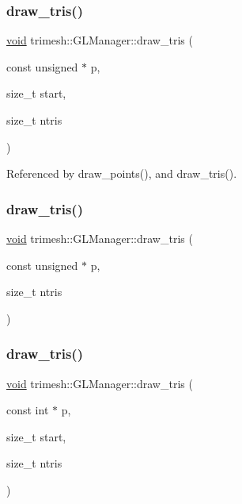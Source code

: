 \subsubsection{\texorpdfstring{draw\+\_\+tris()}{draw\_tris()}\hspace{0.1cm}{\footnotesize\ttfamily [1/9]}}
{\footnotesize\ttfamily \hyperlink{namespacetrimesh_a784ddfd979e1c579bda795a8edfc3f43}{void} trimesh\+::\+G\+L\+Manager\+::draw\+\_\+tris (\begin{DoxyParamCaption}\item[{const unsigned $\ast$}]{p,  }\item[{size\+\_\+t}]{start,  }\item[{size\+\_\+t}]{ntris }\end{DoxyParamCaption})}



Referenced by draw\+\_\+points(), and draw\+\_\+tris().

\mbox{\label{classtrimesh_1_1GLManager_ae97a2e8b47a90a6a684ec6306ba906fb}} 
\subsubsection{\texorpdfstring{draw\+\_\+tris()}{draw\_tris()}\hspace{0.1cm}{\footnotesize\ttfamily [2/9]}}
{\footnotesize\ttfamily \hyperlink{namespacetrimesh_a784ddfd979e1c579bda795a8edfc3f43}{void} trimesh\+::\+G\+L\+Manager\+::draw\+\_\+tris (\begin{DoxyParamCaption}\item[{const unsigned $\ast$}]{p,  }\item[{size\+\_\+t}]{ntris }\end{DoxyParamCaption})\hspace{0.3cm}{\ttfamily [inline]}}

\mbox{\label{classtrimesh_1_1GLManager_ae732f7546ceecc47e22ec70fa412023b}} 
\subsubsection{\texorpdfstring{draw\+\_\+tris()}{draw\_tris()}\hspace{0.1cm}{\footnotesize\ttfamily [3/9]}}
{\footnotesize\ttfamily \hyperlink{namespacetrimesh_a784ddfd979e1c579bda795a8edfc3f43}{void} trimesh\+::\+G\+L\+Manager\+::draw\+\_\+tris (\begin{DoxyParamCaption}\item[{const int $\ast$}]{p,  }\item[{size\+\_\+t}]{start,  }\item[{size\+\_\+t}]{ntris }\end{DoxyParamCaption})\hspace{0.3cm}{\ttfamily [inline]}}

